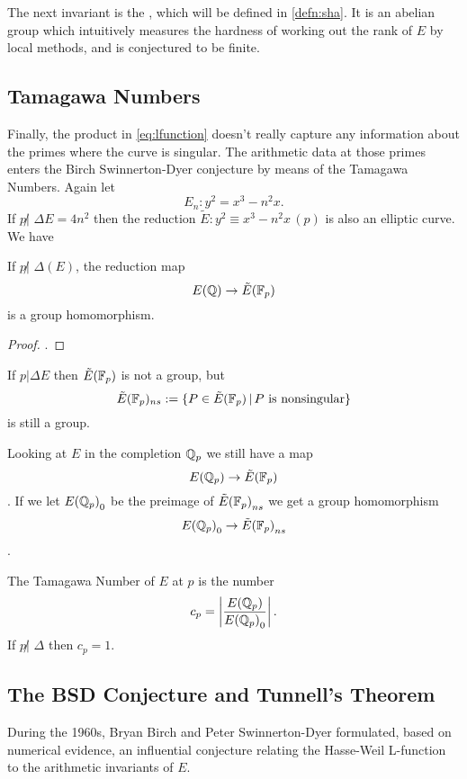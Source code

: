 \documentclass[12pt, a4paper]{amsart}
\begin{document}
The next invariant is the , which will
be defined in \autoref{defn:sha}. It is an abelian group which intuitively measures
the hardness of working out the rank of $E$ by local methods, and is conjectured
to be finite.

\subsection{Tamagawa Numbers}

Finally, the product in \autoref{eq:lfunction} doesn't really capture any information
about the primes where the curve is singular. The arithmetic data at those
primes enters the Birch Swinnerton-Dyer conjecture by means of the Tamagawa
Numbers.
Again let
$$ E_n : y^2 = x^3 - n^2 x. $$
If $p \not| \,\, \Delta E = 4n^2$ then the reduction $\tilde{E} : y^2 \equiv x^3 - n^2 x \,
(p)$ is
also an elliptic curve. We have

\begin{prop}
  If $p \not| \,\, \Delta(E)$, the reduction map
  $$E({\mathbb Q}) \rightarrow \tilde{E}(\mathbb{F}_p)$$ is a group homomorphism.
\end{prop}
\begin{proof}
  \cite[See][Chapter IV, pages 121-123]{rational}.
\end{proof}

If $p | \Delta E$ then $\tilde{E}(\mathbb{F}_p)$ is not a group, but
\[
  \tilde{E}(\mathbb{F}_p)_{ns} := \{P \in \tilde{E}(\mathbb{F}_p) \,|\, P \text{ is nonsingular}\}
  \]
is still a group.

Looking at $E$ in the completion ${\mathbb Q}_p$ we still have a map
\[{E({\mathbb Q}_p)} \rightarrow {\tilde{E}(\mathbb{F}_p)}\].
If we let ${E({\mathbb Q}_p)}_0$ be the preimage of ${\tilde{E}(\mathbb{F}_p)}_{ns}$ we get a group homomorphism
\[ {E({\mathbb Q}_p)}_0 \rightarrow {\tilde{E}(\mathbb{F}_p)}_{ns} \].

\begin{defn}
  The Tamagawa Number of $E$ at $p$ is the number
  $$c_p = \left| \frac{{E({\mathbb Q}_p)}}{{E({\mathbb Q}_p)}_0}
  \right|.$$
  If $p \not| \,\, \Delta$ then $c_p = 1$.
\end{defn}  
  
\subsection{The BSD Conjecture and Tunnell's Theorem}

During the 1960s, Bryan Birch and Peter Swinnerton-Dyer formulated, based
on numerical evidence, an influential conjecture relating the Hasse-Weil
L-function to the arithmetic invariants of $E$.
\end{document}
